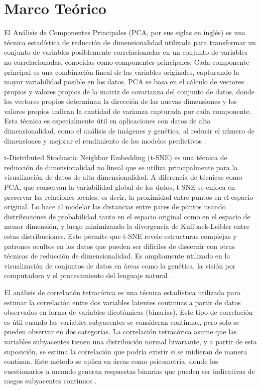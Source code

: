 \documentclass[10pt,journal,compsoc]{IEEEtran}
\begin{document}
\section{Marco Teórico}
El Análisis de Componentes Principales (PCA, por sus siglas en inglés) es una técnica estadística de reducción de dimensionalidad utilizada para transformar un conjunto de variables posiblemente correlacionadas en un conjunto de variables no correlacionadas, conocidas como componentes principales. Cada componente principal es una combinación lineal de las variables originales, capturando la mayor variabilidad posible en los datos. PCA se basa en el cálculo de vectores propios y valores propios de la matriz de covarianza del conjunto de datos, donde los vectores propios determinan la dirección de las nuevas dimensiones y los valores propios indican la cantidad de varianza capturada por cada componente. Esta técnica es especialmente útil en aplicaciones con datos de alta dimensionalidad, como el análisis de imágenes y genética, al reducir el número de dimensiones y mejorar el rendimiento de los modelos predictivos \cite{jolliffe2016pca}.

t-Distributed Stochastic Neighbor Embedding (t-SNE) es una técnica de reducción de dimensionalidad no lineal que se utiliza principalmente para la visualización de datos de alta dimensionalidad. A diferencia de técnicas como PCA, que conservan la variabilidad global de los datos, t-SNE se enfoca en preservar las relaciones locales, es decir, la proximidad entre puntos en el espacio original. Lo hace al modelar las distancias entre pares de puntos usando distribuciones de probabilidad tanto en el espacio original como en el espacio de menor dimensión, y luego minimizando la divergencia de Kullback-Leibler entre estas distribuciones. Esto permite que t-SNE revele estructuras complejas y patrones ocultos en los datos que pueden ser difíciles de discernir con otras técnicas de reducción de dimensionalidad. Es ampliamente utilizado en la visualización de conjuntos de datos en áreas como la genética, la visión por computadora y el procesamiento del lenguaje natural \cite{maaten2008tsne}.

El análisis de correlación tetracórica es una técnica estadística utilizada para estimar la correlación entre dos variables latentes continuas a partir de datos observados en forma de variables dicotómicas (binarias). Este tipo de correlación es útil cuando las variables subyacentes se consideran continuas, pero solo se pueden observar en dos categorías. La correlación tetracórica asume que las variables subyacentes tienen una distribución normal bivariante, y a partir de esta suposición, se estima la correlación que podría existir si se midieran de manera continua. Este método se aplica en áreas como psicometría, donde los cuestionarios a menudo generan respuestas binarias que pueden ser indicativas de rasgos subyacentes continuos \cite{olsson1979maximum}.
\end{document}
